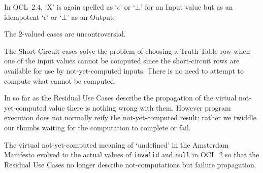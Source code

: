 \documentclass{jot}
\begin{document}
In OCL~2.4, `X' is again spelled as `$\epsilon$' or `$\bot$' for an Input value but as an idempotent `$\epsilon$' or `$\bot$' as an Output.

The 2-valued cases are uncontroversial.

The Short-Circuit cases solve the problem of choosing a Truth Table row when one of the input values cannot be computed since the short-circuit rows are available for use by not-yet-computed inputs. There is no need to attempt to compute what cannot be computed.


In so far as the Residual Use Cases describe the propagation of the virtual not-yet-computed value there is nothing wrong with them. However program execution does not normally reify the not-yet-computed result; rather we twiddle our thumbs waiting for the computation to complete or fail.

The virtual not-yet-computed meaning of `undefined' in the Amsterdam Manifesto evolved to the actual values of \verb$invalid$ and \verb$null$ in OCL~2 so that the Residual Use Cases no longer describe not-computations but failure propagation. %
\end{document}
